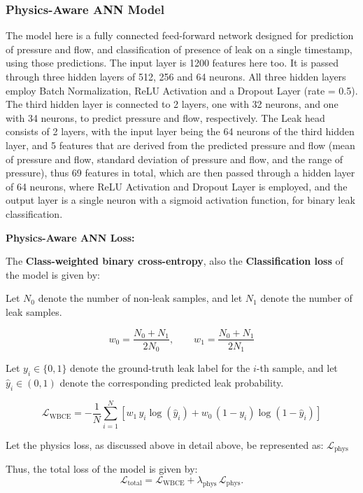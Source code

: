 \documentclass[final,5p,times,twocolumn,authoryear]{elsarticle}
\begin{document}
\subsubsection{\textbf{Physics-Aware ANN} Model}

The model here is a fully connected feed-forward network designed for prediction of pressure and flow, and classification of presence of leak on a single timestamp, using those predictions. The input layer is 1200 features here too. It is passed through three hidden layers of 512, 256 and 64 neurons. All three hidden layers employ Batch Normalization, ReLU Activation and a Dropout Layer (rate  = 0.5). The third hidden layer is connected to 2 layers, one with 32 neurons, and one with 34 neurons, to predict pressure and flow, respectively. The Leak head consists of 2 layers, with the input layer being the 64 neurons of the third hidden layer, and 5 features that are derived from the predicted pressure and flow (mean of pressure and flow, standard deviation of pressure and flow, and the range of pressure), thus 69 features in total, which are then passed through a hidden layer of 64 neurons, where ReLU Activation and Dropout Layer is employed, and the output layer is a single neuron with a sigmoid activation function, for binary leak classification.

\vspace{0.5cm}

\textbf{\textbf{Physics-Aware ANN} Loss: }

The \textbf{Class-weighted binary cross-entropy}, also the \textbf{Classification loss} of the model is given by:

Let \(N_0\) denote the number of non-leak samples, and  
let \(N_1\) denote the number of leak samples.

\[
w_0 = \frac{N_0 + N_1}{2 N_0}, \qquad
w_1 = \frac{N_0 + N_1}{2 N_1}
\]

Let \(y_i \in \{0,1\}\) denote the ground-truth leak label for the \(i\)-th sample,  
and let \(\hat{y}_i \in (0,1)\) denote the corresponding predicted leak probability.

\[
\mathcal{L}_{\text{WBCE}}
= - \frac{1}{N} \sum_{i=1}^{N}
\left[
w_1 \, y_i \log(\hat{y}_i)
+ w_0 \, (1 - y_i) \log(1 - \hat{y}_i)
\right]
\]

Let the physics loss, as discussed above in detail above, be represented as:
$\mathcal{L}_{\mathrm{phys}}$

Thus, the total loss of the model is given by:
\[
\mathcal{L}_{\mathrm{total}}
=
\mathcal{L}_{\mathrm{WBCE}}
+
\lambda_{\mathrm{phys}} \, \mathcal{L}_{\mathrm{phys}}.
\]
\end{document}
